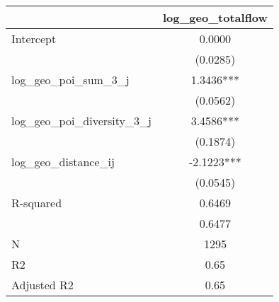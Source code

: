 \begin{table}
\caption{}
\begin{center}
\begin{tabular}{lc}
\hline
                               & log\_geo\_totalflow  \\
\midrule
Intercept                      & 0.0000               \\
                               & (0.0285)             \\
log\_geo\_poi\_sum\_3\_j       & 1.3436***            \\
                               & (0.0562)             \\
log\_geo\_poi\_diversity\_3\_j & 3.4586***            \\
                               & (0.1874)             \\
log\_geo\_distance\_ij         & -2.1223***           \\
                               & (0.0545)             \\
R-squared                      & 0.6469               \\
                               & 0.6477               \\
N                              & 1295                 \\
R2                             & 0.65                 \\
Adjusted R2                    & 0.65                 \\
\hline
\end{tabular}
\end{center}
\end{table}